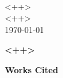 \documentclass[12pt]{article}
\begin{document}
\noindent <++> \\ %
<++> \\ %
<++> \\ %
\today

\begin{center}
  \textbf{<++>} %
\end{center}


\newpage
\begin{center}
  \textbf{Works Cited}
\end{center}

\printbibliography
\end{document}
